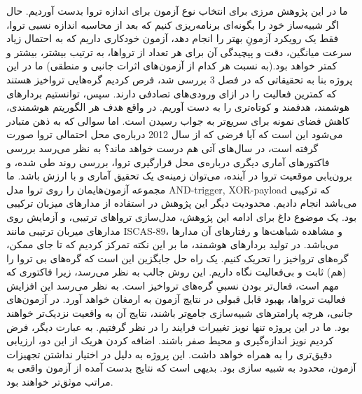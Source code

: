 ما در این پژوهش مرزی برای انتخاب نوع آزمون برای اندازه تروا بدست آوردیم. حال اگر شبیه‌ساز خود را بگونه‌ای برنامه‌ریزی کنیم که بعد از محاسبه اندازه نسبی تروا، فقط یک رویکرد آزمونِ بهتر را انجام دهد، آزمون خودکاری داریم که به احتمال زیاد سرعت میانگین، دقت و پیچیدگی آن برای هر تعداد از تروا‌ها، به ترتیب بیشتر، بیشتر و کمتر خواهد بود.(به نسبت هر کدام از آزمون‌های اثرات جانبی و منطقی)
ما در این پروژه بنا به تحقیقاتی که در فصل 3 بررسی شد، فرص کردیم گره‌هایی تروا‌خیز هستند که کمترین فعالیت را در ازای ورودی‌های تصادفی دارند. سپس، توانستیم بردارهای هوشمند، هدفمند و کوتاه‌تری را به دست آوریم. در واقع هدف هر الگوریتم هوشمندی، کاهش فضای نمونه برای سریع‌تر به جواب رسیدن است.  اما سوالی که به ذهن متبادر می‌شود این است که آیا فرضی که از سال 2012 درباره‌ی محل احتمالی تروا صورت گرفته است، در سال‌های آتی هم درست خواهد ماند؟ به نظر می‌رسد بررسی فاکتورهای آماری دیگری درباره‌ی محل قرارگیری تروا، بررسی روند طی شده، و برون‌یابی موقعیت تروا در آینده، می‌توان زمینه‌ی یک تحقیق آماری و با ارزش باشد.
ما مجموعه آزمون‌هایمان را روی تروا مدل AND-trigger, XOR-payload که ترکیبی می‌باشد انجام دادیم. محدودیت دیگر این پژوهش در استفاده از مدارهای میزبان ترکیبی بود. یک موضوع داغ برای ادامه این پژوهش، مدل‌سازی تروا‌های ترتیبی، و آزمایش روی مدارهای میربان ترتیبی مانند ISCAS-89، و مشاهده شباهت‌ها و رفتارهای آن مدارها می‌باشد.
در تولید بردارهای هوشمند، ما بر این نکته تمرکز کردیم که تا جای ممکن، گره‌های تروا‌خیز را تحریک کنیم. یک راه حل جایگزین این است که گره‌های بی تروا را (هم) ثابت و بی‌فعالیت نگاه داریم. این روش جالب به نظر می‌رسد، زیرا فاکتوری که مهم است، فعال‌تر بودن نسبیِ گره‌های تروا‌خیز است. به نظر می‌رسد این افزایش فعالیت تروا‌ها، بهبود قابل قبولی در نتایج آزمون به ارمغان خواهد آورد.
در آزمون‌های جانبی، هرچه پارامترهای شبیه‌سازی جامع‌تر باشند، نتایج آن به واقعیت نزدیک‌تر خواهند بود. ما در این پروژه تنها نویز تغییرات فرایند را در نظر گرفتیم. به عبارت دیگر، فرض کردیم نویز اندازه‌گیری و محیط صفر باشند. اضافه کردن هریک از این دو، ارزیابی دقیق‌تری را به همراه خواهد داشت.
این پروژه به دلیل در اختیار نداشتن تجهیزات آزمون، محدود به شبیه سازی بود. بدیهی است که نتایج بدست آمده از آزمون واقعی به مراتب موثق‌تر خواهند بود.